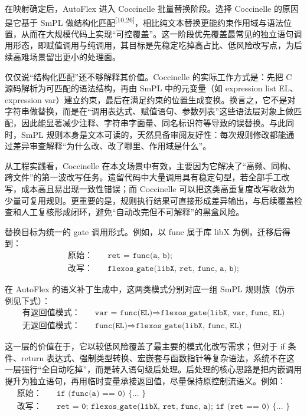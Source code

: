 \documentclass[UTF8,a4paper,12pt,twoside]{ctexart}  %
\begin{document}
在映射确定后，AutoFlex 进入 Coccinelle 批量替换阶段。选择 Coccinelle
的原因是它基于 SmPL
做结构化匹配\textsuperscript{[10,26]}，相比纯文本替换更能约束作用域与语法位置，从而在大规模代码上实现``可控覆盖''。这一阶段优先覆盖最常见的独立语句调用形态，即赋值调用与纯调用，其目标是先稳定吃掉高占比、低风险改写点，为后续高难场景留出更小的处理面。

仅仅说``结构化匹配''还不够解释其价值。Coccinelle 的实际工作方式是：先把
C 源码解析为可匹配的语法结构，再由 SmPL 中的元变量（如 expression list
EL、expression
var）建立约束，最后在满足约束的位置生成变换。换言之，它不是对字符串做替换，而是在``调用表达式、赋值语句、参数列表''这些语法层对象上做匹配，因此能显著减少注释、字符串字面量、同名标识符等导致的误替换。与此同时，SmPL
规则本身是文本可读的，天然具备审阅友好性：每次规则修改都能通过差异审查解释``为什么改、改了哪里、作用域是什么''。

从工程实践看，Coccinelle
在本文场景中有效，主要因为它解决了``高频、同构、跨文件''的第一波改写任务。遗留代码中大量调用具有稳定句型，若全部手工改写，成本高且易出现一致性错误；而
Coccinelle
可以把这类高重复度改写收敛为少量可复用规则。更重要的是，规则执行结果可直接形成差异输出，与后续覆盖检查和人工复核形成闭环，避免``自动改完但不可解释''的黑盒风险。

替换目标为统一的 gate 调用形式。例如，以 func 属于库 libX
为例，迁移后得到：
\begin{equation}
\begin{aligned}
\text{原始：}\quad & \texttt{ret = func(a, b);} \\
\text{改写：}\quad & \texttt{flexos\_gate(libX, ret, func, a, b);} 
\end{aligned}
\end{equation}

在 AutoFlex 的语义补丁生成中，这两类模式分别对应一组 SmPL
规则族（伪示例见下式）：
\begin{equation}
\begin{aligned}
\text{有返回值模式：}\quad & \texttt{var = func(EL)} \Rightarrow \texttt{flexos\_gate(libX, var, func, EL)} \\
\text{无返回值模式：}\quad & \texttt{func(EL)} \Rightarrow \texttt{flexos\_gate(libX, func, EL)}
\end{aligned}
\end{equation}

这一层的价值在于，它以较低风险覆盖了最主要的模式化改写需求；但对于 if
条件、return
表达式、强制类型转换、宏嵌套与函数指针等复杂语法，系统不在这一层强行``全自动吃掉''，而是转入语句级后处理。后处理的核心思路是把内嵌调用提升为独立语句，再用临时变量承接返回值，尽量保持原控制流语义。例如：
\begin{equation}
\begin{aligned}
\text{原始：}\quad & \texttt{if (func(a) == 0) \{ ... \}} \\
\text{改写：}\quad & \texttt{ret = 0;\ flexos\_gate(libX, ret, func, a);\ if (ret == 0) \{ ... \}}
\end{aligned}
\end{equation}
\end{document}
